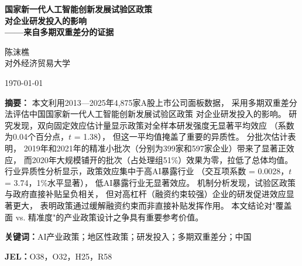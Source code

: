 \documentclass[12pt, a4paper]{article}
\begin{document}
\begin{titlepage}
\begin{center}
\vspace*{2cm}

{\Large\bfseries\heiti
国家新一代人工智能创新发展试验区政策\\[0.4em]
对企业研发投入的影响\\[0.5em]
{\normalsize\kaiti ——来自多期双重差分的证据}}

\vspace{1.5cm}

{\normalsize 陈沫樵}\\[0.3em]
{\small\kaiti 对外经济贸易大学}

\vspace{0.8cm}
{\small\today}

\vspace{2cm}
\begin{minipage}{0.88\textwidth}
\small\kaiti{}
\textbf{摘\quad 要：}
本文利用2013—2025年4,875家A股上市公司面板数据，
采用多期双重差分法评估中国国家新一代人工智能创新发展试验区政策
对企业研发投入的影响。
研究发现，双向固定效应估计量显示政策对全样本研发强度无显著平均效应
（系数为0.04个百分点，$t$ = 1.38），
但这一平均值掩盖了重要的异质性。
分批次估计表明，
2019年和2021年的精准小批次（分别为399家和597家企业）带来了显著正效应，
而2020年大规模铺开的批次（占处理组51\%）效果为零，拉低了总体均值。
行业异质性分析显示，政策效应集中于高AI暴露行业
（交互项系数 = 0.0028，$t$ = 3.74，1\%水平显著），
低AI暴露行业无显著效应。
机制分析发现，试验区政策与政府直接补贴呈负相关，
但对高杠杆（融资约束较强）企业的研发促进效应显著更大，
表明政策通过缓解融资约束而非直接补贴发挥作用。
本文结论对"覆盖面 vs. 精准度"的产业政策设计之争具有重要参考价值。

\vspace{0.5em}
\textbf{关键词：}AI产业政策；地区性政策；研发投入；多期双重差分；中国

\vspace{0.5em}
\textbf{JEL：}O38，O32，H25，R58
\end{minipage}

\vfill


\end{center}
\end{titlepage}
\end{document}
